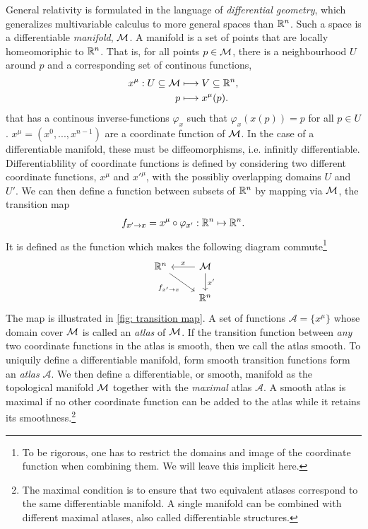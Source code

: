 General relativity is formulated in the language of \emph{differential geometry}, which generalizes multivariable calculus to more general spaces than $\mathbb{R}^n$.
Such a space is a differentiable \emph{manifold}, $\mathcal{M}$.
A manifold is a set of points that are locally homeomoriphic to $\mathbb{R}^n$.
That is, for all points $p \in \mathcal{M}$, there is a neighbourhood $U$ around $p$ and a corresponding set of continous functions,
\begin{align}
    x^\mu: U \subseteq \mathcal{M} & \longmapsto V \subseteq \mathbb{R}^n, \\
    p & \longmapsto x^\mu(p).
\end{align}
that has a continous inverse-functions $\varphi_x$ such that $\varphi_x(x(p)) = p$ for all $p \in U$.
$x^\mu = (x^0, ..., x^{n- 1})$ are a coordinate function of $\mathcal{M}$.
In the case of a differentiable manifold, these must be diffeomorphisms, i.e. infinitly differentiable.
Differentiablility of coordinate functions is defined by considering two different coordinate functions, $x^\mu$ and $x'^\mu$, with the possibliy overlapping domains $U$ and $U'$.
We can then define a function between subsets of $\mathbb{R}^n$ by mapping via $\mathcal{M}$, the transition map  
\begin{align}
    f_{x'\rightarrow x} = x^\mu\circ\varphi_{x'} : \mathbb{R}^n \mapsto \mathbb{R}^n.
\end{align}
%
It is defined as the function which makes the following diagram commute\footnote{To be rigorous, one has to restrict the domains and image of the coordinate function when combining them. We will leave this implicit here.}
%
\begin{equation}
    \begin{tikzcd}
        \R^n \arrow[rd, "f_{x'\rightarrow x}"'] & \Em \arrow[l, "x"'] \arrow[d, "x'"] \\
        & \R^n
        \end{tikzcd}
\end{equation}
%
The map is illustrated in \autoref{fig: transition map}.
A set of functions $\mathcal A = \{x^\mu\}$ whose domain cover $\mathcal{M}$ is called an \emph{atlas} of $\mathcal{M}$.
If the transition function between \emph{any} two coordinate functions in the atlas is smooth, then we call the atlas smooth.
To uniquily define a differentiable manifold,  form smooth transition functions form an \emph{atlas} $\mathcal{A}$.
We then define a differentiable, or smooth, manifold as the topological manifold $\mathcal{M}$ together with the \emph{maximal} atlas $\mathcal A$.
A smooth atlas is maximal if no other coordinate function can be added to the atlas while it retains its smoothness.\footnote{The maximal condition is to ensure that two equivalent atlases correspond to the same differentiable manifold. A single manifold can be combined with different maximal atlases, also called differentiable structures. }
